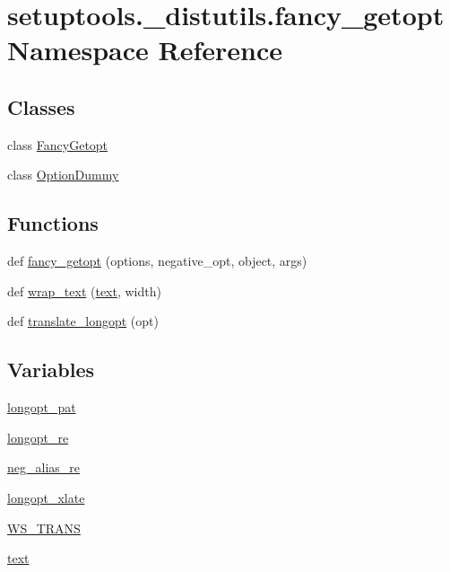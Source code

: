 \hypertarget{namespacesetuptools_1_1__distutils_1_1fancy__getopt}{}\section{setuptools.\+\_\+distutils.\+fancy\+\_\+getopt Namespace Reference}
\label{namespacesetuptools_1_1__distutils_1_1fancy__getopt}
\subsection*{Classes}
\begin{DoxyCompactItemize}
\item 
class \hyperlink{classsetuptools_1_1__distutils_1_1fancy__getopt_1_1FancyGetopt}{Fancy\+Getopt}
\item 
class \hyperlink{classsetuptools_1_1__distutils_1_1fancy__getopt_1_1OptionDummy}{Option\+Dummy}
\end{DoxyCompactItemize}
\subsection*{Functions}
\begin{DoxyCompactItemize}
\item 
def \hyperlink{namespacesetuptools_1_1__distutils_1_1fancy__getopt_a47ff59acdd9c80c1d227b4c57fc76f24}{fancy\+\_\+getopt} (options, negative\+\_\+opt, object, args)
\item 
def \hyperlink{namespacesetuptools_1_1__distutils_1_1fancy__getopt_aa01c8d3e0a2fd41fefc32875efe1215a}{wrap\+\_\+text} (\hyperlink{namespacesetuptools_1_1__distutils_1_1fancy__getopt_af3c1f9e9725fa4c91614ca2eccdd0336}{text}, width)
\item 
def \hyperlink{namespacesetuptools_1_1__distutils_1_1fancy__getopt_a84337e4a816ccdb085cd6beb89ce7b98}{translate\+\_\+longopt} (opt)
\end{DoxyCompactItemize}
\subsection*{Variables}
\begin{DoxyCompactItemize}
\item 
\hyperlink{namespacesetuptools_1_1__distutils_1_1fancy__getopt_a9a9f87aab18fe599747558a58737c190}{longopt\+\_\+pat}
\item 
\hyperlink{namespacesetuptools_1_1__distutils_1_1fancy__getopt_a60c7a52f45f6d8f931dea97318acf6f2}{longopt\+\_\+re}
\item 
\hyperlink{namespacesetuptools_1_1__distutils_1_1fancy__getopt_a000db048c630080d1070094183581a4a}{neg\+\_\+alias\+\_\+re}
\item 
\hyperlink{namespacesetuptools_1_1__distutils_1_1fancy__getopt_a6d04bb4bdf093a0d2ff173f530388fdd}{longopt\+\_\+xlate}
\item 
\hyperlink{namespacesetuptools_1_1__distutils_1_1fancy__getopt_a163c41f299a4a83109f068a7309887e0}{W\+S\+\_\+\+T\+R\+A\+NS}
\item 
\hyperlink{namespacesetuptools_1_1__distutils_1_1fancy__getopt_af3c1f9e9725fa4c91614ca2eccdd0336}{text}
\end{DoxyCompactItemize}



